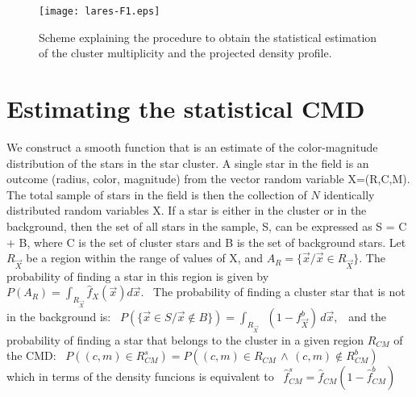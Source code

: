 \documentclass[11pt,twoside
]{article}
\begin{document}
 
 


\begin{figure}[!ht]
  \centering
  \texttt{[image: lares-F1.eps]}
  \caption{Scheme explaining the procedure to obtain the statistical 
     estimation of the cluster multiplicity and the projected density
  profile.}
  \label{fig:ab1}
\end{figure}

                       


\section{Estimating the statistical CMD}

We construct a smooth function that is an estimate of the
color-magnitude distribution of the stars in the star cluster.   A
single star in the field is an outcome (radius, color, magnitude) from
the vector random variable X=(R,C,M). The total sample of stars in the
field is then the collection of $N$ identically distributed random
variables X. If a star is either in the cluster or in the background,
then the set of all stars in the sample, S, can be expressed as S = C
+ B, where C is the set of cluster stars and B is the set of
background stars.
%
Let $R_{\vec{X}}$ be a region within the range of values of X, and
\(\displaystyle   A_R=\{ \vec{x} / \vec{x} \in R_{\vec{X}} \}  \).
The probability of finding a star in this region is given by
%
\mbox{
\(\displaystyle   P ( A_R ) = \int_{R_{\vec{X}} } \hat{f}_{X}(\vec{x})
d\vec{x}.  \) }
%
The probability of finding a cluster star that is not in the
background is:
%
\mbox{
\(\displaystyle   P( \{\vec{x}\in S / \vec{x} \notin B\}) =
\int_{R_{\vec{X}} }  \) \(\displaystyle   \left( 1-f_{\vec{X}}^b
\right) \, d\vec{x},  \) }
%
and the probability of finding a star that belongs to the cluster
in a given region $R_{CM}$ of the CMD:
%
\mbox{
\(\displaystyle   P \left( (c,m)\in R_{CM}^s \right) = P \left(
(c,m)\in R_{CM} \,\wedge\, (c,m)\notin R_{CM}^b \right)  \) }
%
which in terms of the density funcions is equivalent to
%
\mbox{
\(\displaystyle   \hat{f}_{CM}^s = \hat{f}_{CM} \left( 1-
\hat{f}^b_{CM} \right)  \) }

\end{document}
